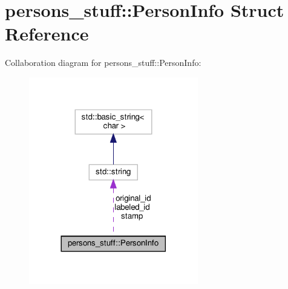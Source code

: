 \hypertarget{structpersons__stuff_1_1PersonInfo}{}\section{persons\+\_\+stuff\+:\+:Person\+Info Struct Reference}
\label{structpersons__stuff_1_1PersonInfo}


Collaboration diagram for persons\+\_\+stuff\+:\+:Person\+Info\+:
\nopagebreak
\begin{figure}[H]
\begin{center}
\leavevmode
\includegraphics[width=209pt]{structpersons__stuff_1_1PersonInfo__coll__graph}
\end{center}
\end{figure}
